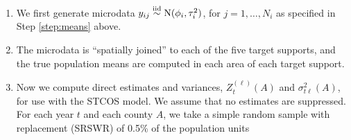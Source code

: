 \documentclass[12pt]{article}
\begin{document}
\begin{enumerate}
\item We first generate microdata $y_{ij} \stackrel{\text{iid}}{\sim} \text{N}(\phi_i, \tau_i^2)$, for $j = 1, \ldots, N_i$ as specified in Step \ref{step:means} above.

\item The microdata is ``spatially joined'' to each of the five target supports, and the true population means are computed in each area of each target support.

\item Now we compute direct estimates and variances, $Z^{(\ell)}_t(A)$ and $\sigma^2_{t\ell}(A)$, for use with the STCOS model. We assume that no estimates are suppressed. For each year $t$ and each county $A$, we take a simple random sample with replacement (SRSWR) of 0.5\% of the population units 


\end{enumerate}
\end{document}
